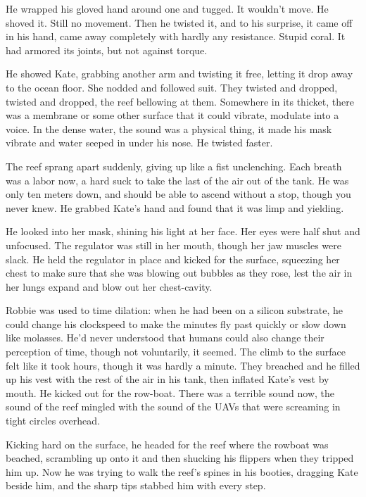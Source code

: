 He wrapped his gloved hand around one and tugged. It wouldn’t move.
He shoved it. Still no movement. Then he twisted it, and to his
surprise, it came off in his hand, came away completely with hardly
any resistance. Stupid coral. It had armored its joints, but not
against torque.

He showed Kate, grabbing another arm and twisting it free, letting
it drop away to the ocean floor. She nodded and followed suit. They
twisted and dropped, twisted and dropped, the reef bellowing at
them. Somewhere in its thicket, there was a membrane or some other
surface that it could vibrate, modulate into a voice. In the dense
water, the sound was a physical thing, it made his mask vibrate and
water seeped in under his nose. He twisted faster.

The reef sprang apart suddenly, giving up like a fist unclenching.
Each breath was a labor now, a hard suck to take the last of the
air out of the tank. He was only ten meters down, and should be
able to ascend without a stop, though you never knew. He grabbed
Kate’s hand and found that it was limp and yielding.

He looked into her mask, shining his light at her face. Her eyes
were half shut and unfocused. The regulator was still in her mouth,
though her jaw muscles were slack. He held the regulator in place
and kicked for the surface, squeezing her chest to make sure that
she was blowing out bubbles as they rose, lest the air in her lungs
expand and blow out her chest-cavity.

Robbie was used to time dilation: when he had been on a silicon
substrate, he could change his clockspeed to make the minutes fly
past quickly or slow down like molasses. He’d never understood that
humans could also change their perception of time, though not
voluntarily, it seemed. The climb to the surface felt like it took
hours, though it was hardly a minute. They breached and he filled
up his vest with the rest of the air in his tank, then inflated
Kate’s vest by mouth. He kicked out for the row-boat. There was a
terrible sound now, the sound of the reef mingled with the sound of
the UAVs that were screaming in tight circles overhead.

Kicking hard on the surface, he headed for the reef where the
rowboat was beached, scrambling up onto it and then shucking his
flippers when they tripped him up. Now he was trying to walk the
reef’s spines in his booties, dragging Kate beside him, and the
sharp tips stabbed him with every step.

